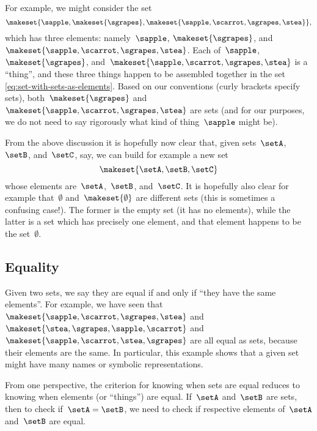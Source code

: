 For example, we might consider the set
%
\begin{equation}
    \label{eq:set-with-sets-as-elements}
    \makeset{ \sapple, \makeset{ \sgrapes }, \makeset{ \sapple, \scarrot, \sgrapes, \stea } },
\end{equation}
%
which has three elements: namely~$\sapple$, $\makeset{ \sgrapes }$, and~$\makeset{ \sapple, \scarrot, \sgrapes, \stea }$.
Each of~$\sapple$, $\makeset{ \sgrapes }$, and~$\makeset{ \sapple, \scarrot, \sgrapes, \stea }$ is a ``thing'', and these three things happen to be assembled together in the set \cref{eq:set-with-sets-as-elements}.
Based on our conventions (curly brackets specify sets), both~$\makeset{ \sgrapes }$ and~$\makeset{ \sapple, \scarrot, \sgrapes, \stea }$ are sets (and for our purposes, we do not need to say rigorously what kind of thing~$\sapple$ might be).

From the above discussion it is hopefully now clear that, given sets~$\setA$,~$\setB$, and~$\setC$, say, we can build for example a new set
\begin{equation*}
    \makeset{ \setA, \setB, \setC }
\end{equation*}
whose elements are~$\setA$,~$\setB$, and~$\setC$.
It is hopefully also clear for example that~$\emptyset$ and~$\makeset{ \emptyset }$ are different sets (this is sometimes a confusing case!).
The former is the empty set (it has no elements), while the latter is a set which has precisely one element, and that element happens to be the set~$\emptyset$.

\subsection{Equality}

Given two sets, we say they are equal if and only if ``they have the same elements''.
For example, we have seen that~$\makeset{ \sapple, \scarrot, \sgrapes, \stea }$ and~$\makeset{ \stea, \sgrapes, \sapple, \scarrot}$ and~$\makeset{ \sapple, \scarrot, \stea, \sgrapes }$ are all equal as sets, because their elements are the same.
In particular, this example shows that a given set might have many names or symbolic representations.

From one perspective, the criterion for knowing when sets are equal reduces to knowing when elements (or ``things'') are equal.
If~$\setA$ and~$\setB$ are sets, then to check if~$\setA = \setB$, we need to check if respective elements of~$\setA$ and~$\setB$ are equal.

